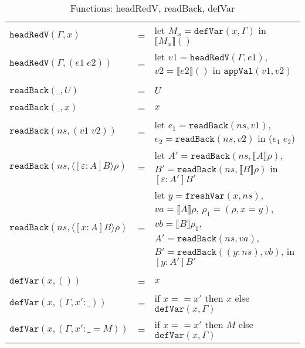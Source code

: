 \begin{table}[h]
  \centering
  \begin{tabular}{l l p{8cm}}
    $\texttt{headRedV}(\Gamma, x)$ & = & let $M_x = \texttt{defVar}(x, \Gamma)$ in $\llbracket M_x \rrbracket ()$ \\
    $\texttt{headRedV}(\Gamma, (e1 \; e2))$ & = & let $v1 = \texttt{headRedV}(\Gamma, e1)$, $v2 = \llbracket e2 \rrbracket ()$ \newline in $\texttt{appVal}(v1, v2)$ \\
    \\
    $\texttt{readBack}(\_, U)$ & = & $U$ \\
    $\texttt{readBack}(\_, x)$ & = & $x$ \\
    $\texttt{readBack}(ns, (v1 \; v2))$ & = & let $e_1 = \texttt{readBack}(ns, v1)$, $e_2 = \texttt{readBack}(ns, v2)$ \newline in ($e_1 \; e_2$) \\
    $\texttt{readBack}(ns, \langle [\varepsilon : A] B \rangle \rho)$ & = & let $A' = \texttt{readBack}(ns, \llbracket A \rrbracket \rho)$, \newline $B' = \texttt{readBack}(ns, \llbracket B \rrbracket \rho)$ \newline in $[\varepsilon : A'] B'$ \\
    $\texttt{readBack}(ns, \langle [x : A] B \rangle \rho)$ & = &  let $y = \texttt{freshVar}(x, ns)$, \newline $va = \llbracket A \rrbracket \rho$, \newline $\rho_1 = (\rho, x = y)$, \newline $vb = \llbracket B \rrbracket \rho_1$, \newline $A' = \texttt{readBack}(ns, va)$, \newline $B' = \texttt{readBack}((y : ns), vb)$, \newline in $[y : A'] B'$ \\
    \\
    $\texttt{defVar}(x, ())$ & = & $x$ \\
    $\texttt{defVar}(x, (\Gamma, x' : \_))$ & = & if $x == x'$ then $x$ else $\texttt{defVar}(x, \Gamma)$ \\
    $\texttt{defVar}(x, (\Gamma, x' : \_ = M))$ & = & if $x == x'$ then $M$ else $\texttt{defVar}(x, \Gamma)$
  \end{tabular}
  \caption{Functions: headRedV, readBack, defVar}
  \label{tab:func-primitive}
\end{table}

